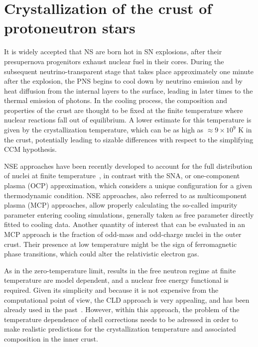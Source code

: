 \chapter{Crystallization of the crust of protoneutron stars}

It is widely accepted that NS are born hot in SN 
explosions, after their presupernova progenitors exhaust nuclear fuel in their
cores. During the subsequent neutrino-transparent stage that takes place 
approximately one minute after the explosion, the PNS 
begins to cool down by neutrino emission and by heat diffusion from the 
internal layers to the surface, leading in later times to the thermal emission 
of photons.
In the cooling process, the composition and properties of the crust are thought 
to be fixed at the finite temperature where nuclear reactions fall out of 
equilibrium. A lower estimate for this temperature is given by the 
crystallization temperature, which can be as high as $\approx 9\times 10^9$ K
in the crust, potentially leading to sizable differences with respect to
the simplifying CCM hypothesis.

NSE approaches have been recently developed 
to account for the full distribution of nuclei at finite 
temperature~\cite{Gulminelli2015}, in contrast with the SNA, or one-component
plasma (OCP) approximation, which considers a unique 
configuration for a given thermodynamic condition. NSE approaches, also 
referred to as multicomponent plasma (MCP) approaches, allow properly 
calculating the so-called impurity parameter entering cooling simulations, 
generally taken as free parameter directly fitted to cooling data. 
Another quantity of interest that can be evaluated in an MCP approach is the 
fraction of odd-mass and odd-charge nuclei in the outer crust. Their presence 
at low temperature might be the sign of ferromagnetic phase transitions, which 
could alter the relativistic electron gas.

As in the zero-temperature limit, results in the free neutron regime at
finite temperature are model dependent, and a nuclear free energy
functional is required. Given its simplicity and because it is not expensive
from the computational point of view, the CLD approach is very appealing, and 
has been already used in the past~\cite{Gulminelli2015,Grams2018}. However,
within this approach, the problem of the temperature dependence of shell 
corrections needs to be adressed in order to make realistic predictions for the 
crystallization temperature and associated composition in the inner crust.

